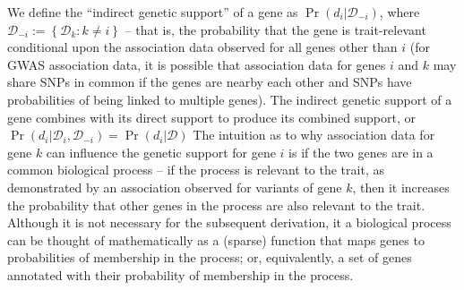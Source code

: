 \documentclass[11pt]{article}
\begin{document}
We define the ``indirect genetic support'' of a gene as
$\Pr\left(d_i|\mathcal{D}_{-i}\right)$, where $\mathcal{D}_{-i} :=
\left\{\mathcal{D}_k : k \neq i\right\}$ -- that is, the probability that
the gene is trait-relevant conditional upon the association data
observed for all genes other than $i$ (for GWAS association data, it
is possible that association data for genes $i$ and $k$ may share
SNPs in common if the genes are nearby each other and SNPs have
probabilities of being linked to multiple genes). The indirect genetic
support of a gene combines with its direct support to produce its
combined support, or $\Pr\left(d_i|\mathcal{D}_{i},\mathcal{D}_{-i}\right)=\Pr\left(d_i|\mathcal{D}\right)$
The intuition as to
why association data for gene $k$ can influence the genetic support
for gene $i$ is if the two genes are in a common biological process
-- if the process is relevant to the trait, as demonstrated by an
association observed for variants of gene $k$, then it increases the
probability that other genes in the process are also relevant to the
trait. Although it is not necessary for the subsequent derivation, it
a biological process can be thought of mathematically as a (sparse)
function that maps genes to probabilities of membership in the
process; or, equivalently, a set of genes annotated with their
probability of membership in the process.
\end{document}
